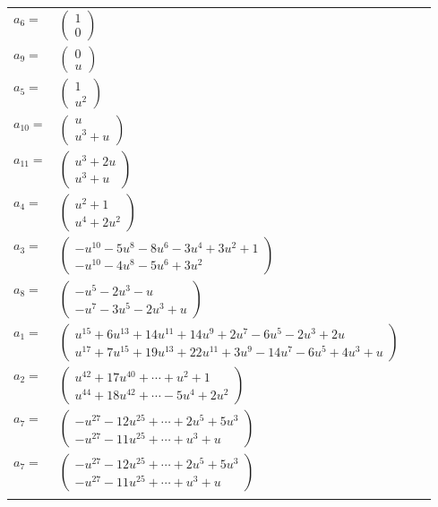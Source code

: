 \documentclass[1p]{elsarticle_modified}
\theoremstyle{definition}
\begin{document}
\begin{tabular}{m{7pt} m{180pt} m{7pt} m{180pt} }
\flushright $a_{6}=$&$\begin{pmatrix}1\\0\end{pmatrix}$ \\
\flushright $a_{9}=$&$\begin{pmatrix}0\\u\end{pmatrix}$ \\
\flushright $a_{5}=$&$\begin{pmatrix}1\\u^2\end{pmatrix}$ \\
\flushright $a_{10}=$&$\begin{pmatrix}u\\u^3+u\end{pmatrix}$ \\
\flushright $a_{11}=$&$\begin{pmatrix}u^3+2 u\\u^3+u\end{pmatrix}$ \\
\flushright $a_{4}=$&$\begin{pmatrix}u^2+1\\u^4+2 u^2\end{pmatrix}$ \\
\flushright $a_{3}=$&$\begin{pmatrix}- u^{10}-5 u^8-8 u^6-3 u^4+3 u^2+1\\- u^{10}-4 u^8-5 u^6+3 u^2\end{pmatrix}$ \\
\flushright $a_{8}=$&$\begin{pmatrix}- u^5-2 u^3- u\\- u^7-3 u^5-2 u^3+u\end{pmatrix}$ \\
\flushright $a_{1}=$&$\begin{pmatrix}u^{15}+6 u^{13}+14 u^{11}+14 u^9+2 u^7-6 u^5-2 u^3+2 u\\u^{17}+7 u^{15}+19 u^{13}+22 u^{11}+3 u^9-14 u^7-6 u^5+4 u^3+u\end{pmatrix}$ \\
\flushright $a_{2}=$&$\begin{pmatrix}u^{42}+17 u^{40}+\cdots+u^2+1\\u^{44}+18 u^{42}+\cdots-5 u^4+2 u^2\end{pmatrix}$ \\
\flushright $a_{7}=$&$\begin{pmatrix}- u^{27}-12 u^{25}+\cdots+2 u^5+5 u^3\\- u^{27}-11 u^{25}+\cdots+u^3+u\end{pmatrix}$\\ \flushright $a_{7}=$&$\begin{pmatrix}- u^{27}-12 u^{25}+\cdots+2 u^5+5 u^3\\- u^{27}-11 u^{25}+\cdots+u^3+u\end{pmatrix}$\\&\end{tabular}
\end{document}
